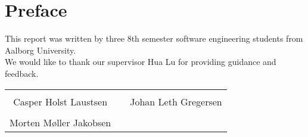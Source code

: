 \thispagestyle{empty}
\section*{Preface}
This report was written by three 8th semester software engineering students from Aalborg University.\\

\vspace{.2cm}
\noindent We would like to thank our supervisor Hua Lu for providing guidance and feedback.

\begin{table}[H]
	\centering
	\vspace{2cm}
		\begin{tabular}{c c c}
			\underline{\phantom{JAERJAERJAERJAERGO}} & \phantom{cookies} & \underline{\phantom{JAERJAERJAERJAERGO}} \\
			Casper Holst Laustsen & \phantom{cookies} & Johan Leth Gregersen\\[1.5cm]
		    \underline{\phantom{JAERJAERJAERJAERGO}} & \phantom{cookies} & {\phantom{JAERJAERJAERJAERGO}} \\
			Morten Møller Jakobsen & \phantom{cookies} & \\[1.5cm]				
		\end{tabular}
\end{table}
